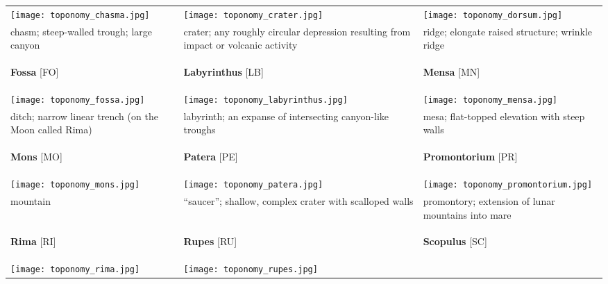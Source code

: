 \begin{longtable}{p{45mm}|p{45mm}|p{45mm}}
\texttt{[image: toponomy\_chasma.jpg]} & 
\texttt{[image: toponomy\_crater.jpg]} & 
\texttt{[image: toponomy\_dorsum.jpg]} \\
chasm; steep-walled trough; large canyon & crater; any roughly circular depression resulting from impact or volcanic activity & ridge; elongate raised structure; wrinkle ridge \\\midrule
\begin{center}\textbf{Fossa} [FO]\end{center} & \begin{center}\textbf{Labyrinthus} [LB]\end{center} & \begin{center}\textbf{Mensa} [MN]\end{center} \\
\texttt{[image: toponomy\_fossa.jpg]} & 
\texttt{[image: toponomy\_labyrinthus.jpg]} & 
\texttt{[image: toponomy\_mensa.jpg]} \\
ditch; narrow linear trench (on the Moon called Rima) & labyrinth; an expanse of intersecting  canyon-like troughs & mesa; flat-topped elevation with steep walls \\\midrule
\begin{center}\textbf{Mons} [MO]\end{center} & \begin{center}\textbf{Patera} [PE]\end{center} & \begin{center}\textbf{Promontorium} [PR]\end{center} \\
\texttt{[image: toponomy\_mons.jpg]} & 
\texttt{[image: toponomy\_patera.jpg]} & 
\texttt{[image: toponomy\_promontorium.jpg]} \\
mountain & ``saucer''; shallow, complex crater with scalloped walls & promontory; extension of lunar mountains into mare \\\midrule
\begin{center}\textbf{Rima} [RI]\end{center} & \begin{center}\textbf{Rupes} [RU]\end{center} & \begin{center}\textbf{Scopulus} [SC]\end{center} \\ 
\texttt{[image: toponomy\_rima.jpg]} & 
\texttt{[image: toponomy\_rupes.jpg]} & 

\end{longtable}
